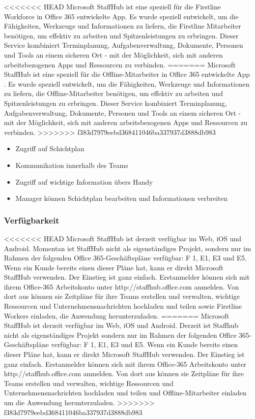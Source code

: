 <<<<<<< HEAD
Microsoft StaffHub ist eine speziell für die Firstline Workforce in Office 365 entwickelte App. Es wurde speziell entwickelt, um die Fähigkeiten, Werkzeuge und Informationen zu liefern, die Firstline Mitarbeiter benötigen, um effektiv zu arbeiten und Spitzenleistungen zu erbringen. Dieser Service kombiniert Terminplanung, Aufgabenverwaltung, Dokumente, Personen und Tools an einem sicheren Ort - mit der Möglichkeit, sich mit anderen arbeitsbezogenen Apps und Ressourcen zu verbinden.
=======
Microsoft StaffHub ist eine speziell für die Offline-Mitarbeiter in Office 365 entwickelte App . Es wurde speziell entwickelt, um die Fähigkeiten, Werkzeuge und Informationen zu liefern, die Offline-Mitarbeiter benötigen, um effektiv zu arbeiten und Spitzenleistungen zu erbringen. Dieser Service kombiniert Terminplanung, Aufgabenverwaltung, Dokumente, Personen und Tools an einem sicheren Ort - mit der Möglichkeit, sich mit anderen arbeitsbezogenen Apps und Ressourcen zu verbinden.
>>>>>>> f383d7979eebd368411046ba337937d3888db983
\begin{itemize}
\item Zugriff auf Schichtplan
\item Kommunikation innerhalb des Teams
\item Zugriff auf wichtige Information übers Handy
\item Manager können Schichtplan bearbeiten und Informationen verbreiten
\end{itemize}

\subsubsection{Verfügbarkeit}
<<<<<<< HEAD
Microsoft StaffHub ist derzeit verfügbar im Web, iOS und Android. Momentan ist StaffHub nicht als eigenständiges Projekt, sondern nur im Rahmen der folgenden Office 365-Geschäftspläne verfügbar: F 1, E1, E3 und E5. Wenn ein Kunde bereits einen dieser Pläne hat, kann er direkt Microsoft StaffHub verwenden. Der Einstieg ist ganz einfach. Erstanmelder können sich mit ihrem Office-365 Arbeitskonto unter http://staffhub.office.com anmelden. Von dort aus können sie Zeitpläne für ihre Teams erstellen und verwalten, wichtige Ressourcen und Unternehmensnachrichten hochladen und teilen sowie Firstline Workers einladen, die Anwendung herunterzuladen.
=======
Microsoft StaffHub ist derzeit verfügbar im Web, iOS und Android. Derzeit ist Staffhub nicht als eigenständiges Projekt sondern nur im Rahmen der folgenden Office 365-Geschäftspläne verfügbar: F 1, E1, E3 und E5. Wenn ein Kunde bereits einen dieser Pläne hat, kann er direkt Microsoft StaffHub verwenden. Der Einstieg ist ganz einfach. Erstanmelder können sich mit ihrem Office-365 Arbeitskonto unter http://staffhub.office.com anmelden. Von dort aus können sie Zeitpläne für ihre Teams erstellen und verwalten, wichtige Ressourcen und Unternehmensnachrichten hochladen und teilen und Offline-Mitarbeiter einladen um die Anwendung herunterzuladen.
>>>>>>> f383d7979eebd368411046ba337937d3888db983

